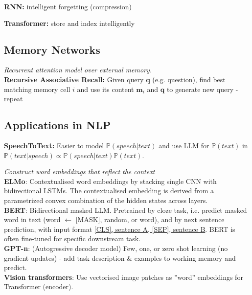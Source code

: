 \textbf{RNN:} intelligent forgetting (compression)

\textbf{Transformer:} store and index intelligently\\


\subsection*{Memory Networks}
\textit{Recurrent attention model over external memory.}\\
\textbf{Recursive Associative Recall:} Given query $\mathbf q$ (e.g. question), find best matching memory cell $i$ and use its content $\mathbf m_i$ and $\mathbf q$ to generate new query - repeat
\subsection*{Applications in NLP}
\textbf{SpeechToText:} Easier to model $\mathbb P(speech | text)$ and use LLM for $\mathbb P(text)$ in $\mathbb P(text|speech) \propto \mathbb P(speech | text) \mathbb P(text)$.

\textit{Construct word embeddings that reflect the context}\\
\textbf{ELMo}: Contextualised word embeddings by stacking single CNN with bidirectional LSTMs. The contextualised embedding is derived from a parametrized convex combination of the hidden states across layers.\\
\textbf{BERT}: Bidirectional masked LLM. Pretrained by cloze task, i.e. predict masked word in text (word $\gets$ [MASK], random, or word), and by next sentence prediction, with input format \underline{[CLS], sentence A, [SEP], sentence B}. BERT is often fine-tuned for specific downstream task.\\
\textbf{GPT-n}: (Autogressive decoder model) Few, one, or zero shot learning (no gradient updates) - add task description \& examples to working memory and predict.\\
\textbf{Vision transformers}: Use vectorised image patches as ''word'' embeddings for Transformer (encoder).
\color{red}
